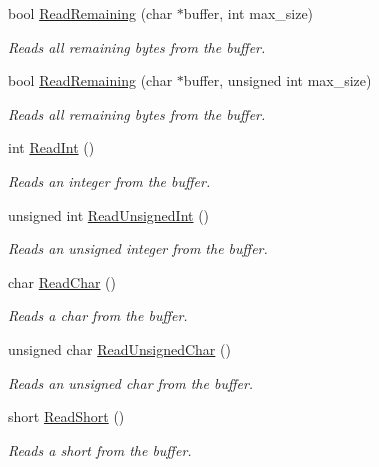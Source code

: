 \begin{DoxyCompactItemize}
bool \hyperlink{class_senergy_1_1_byte_buffer_a391deafd9b6e3c4b4c2b92fe78358ebf}{Read\-Remaining} (char $\ast$buffer, int max\-\_\-size)
\begin{DoxyCompactList}\small\item\em Reads all remaining bytes from the buffer. \end{DoxyCompactList}\item 
bool \hyperlink{class_senergy_1_1_byte_buffer_a8e9ec7a8d6c26c01a738768928fff704}{Read\-Remaining} (char $\ast$buffer, unsigned int max\-\_\-size)
\begin{DoxyCompactList}\small\item\em Reads all remaining bytes from the buffer. \end{DoxyCompactList}\item 
int \hyperlink{class_senergy_1_1_byte_buffer_ab15f04d43dd82cebf6dc25254d210e4e}{Read\-Int} ()
\begin{DoxyCompactList}\small\item\em Reads an integer from the buffer. \end{DoxyCompactList}\item 
unsigned int \hyperlink{class_senergy_1_1_byte_buffer_a7abe5475b2a9adcad384d3125640aba2}{Read\-Unsigned\-Int} ()
\begin{DoxyCompactList}\small\item\em Reads an unsigned integer from the buffer. \end{DoxyCompactList}\item 
char \hyperlink{class_senergy_1_1_byte_buffer_a806db1b33ff86b572a0804879d181dc8}{Read\-Char} ()
\begin{DoxyCompactList}\small\item\em Reads a char from the buffer. \end{DoxyCompactList}\item 
unsigned char \hyperlink{class_senergy_1_1_byte_buffer_ad9a7a05b0285fe070cde3983458de5f6}{Read\-Unsigned\-Char} ()
\begin{DoxyCompactList}\small\item\em Reads an unsigned char from the buffer. \end{DoxyCompactList}\item 
short \hyperlink{class_senergy_1_1_byte_buffer_a989443842e20c2feba4268e968911fe8}{Read\-Short} ()
\begin{DoxyCompactList}\small\item\em Reads a short from the buffer. \end{DoxyCompactList}\item 

\end{DoxyCompactItemize}
